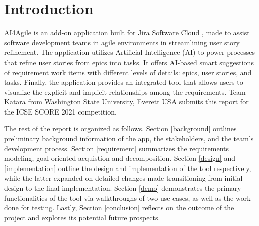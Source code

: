 \section{Introduction}
AI4Agile is an add-on application built for Jira Software Cloud \cite{jira2}, made to assist software development teams in agile environments in streamlining user story refinement. The application utilizes Artificial Intelligence (AI) to power processes that refine user stories from epics into tasks. It offers AI-based smart suggestions of requirement work items with different levels of details: epics, user stories, and tasks. Finally, the application provides an integrated tool that allows users to visualize the explicit and implicit relationships among the requirements. Team Katara from Washington State University, Everett USA submits this report for the ICSE SCORE 2021 competition. 

The rest of the report is organized as follows. Section \ref{background} outlines preliminary background information of the app, the stakeholders, and the team's development process. Section \ref{requirement} summarizes the requirements modeling, goal-oriented acquistion and decomposition. Section \ref{design} and \ref{implementation} outline the design and implementation of the tool respectively, while the latter expanded on detailed changes made transitioning from initial design to the final implementation. Section \ref{demo} demonstrates the primary functionalities of the tool via walkthroughs of two use cases, as well as the work done for testing. Lastly, Section \ref{conclusion} reflects on the outcome of the project and explores its potential future prospects. 
